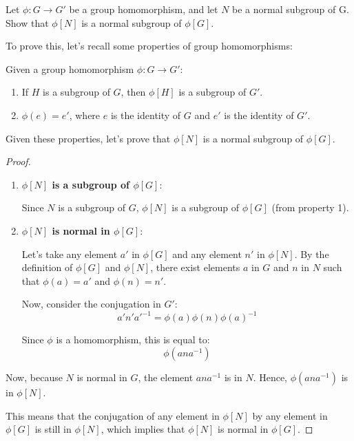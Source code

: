 \documentclass[12pt]{amsart}
\theoremstyle{definition}
\numberwithin{equation}{section}
\theoremstyle{plain}
\begin{document}
\begin{exercise}{35} Let $\phi : G \rightarrow G'$ be a group homomorphism, and let $N$ be a normal subgroup of G. Show that $\phi[N]$ is a normal subgroup of $\phi[G]$.
    
    To prove this, let's recall some properties of group homomorphisms:

    Given a group homomorphism \( \phi: G \rightarrow G' \):
    \begin{enumerate}
        \item If \( H \) is a subgroup of \( G \), then \( \phi[H] \) is a subgroup of \( G' \).
        \item \( \phi(e) = e' \), where \( e \) is the identity of \( G \) and \( e' \) is the identity of \( G' \).
    \end{enumerate}
    
    Given these properties, let's prove that \( \phi[N] \) is a normal subgroup of \( \phi[G] \).
    
    \begin{proof} $ $ \\
    
    \begin{enumerate}
        \item \textbf{\( \phi[N] \) is a subgroup of \( \phi[G] \)}:
        
        Since \( N \) is a subgroup of \( G \), \( \phi[N] \) is a subgroup of \( \phi[G] \) (from property 1).
        
        \item \textbf{\( \phi[N] \) is normal in \( \phi[G] \)}:
        
        Let's take any element \( a' \) in \( \phi[G] \) and any element \( n' \) in \( \phi[N] \). By the definition of \( \phi[G] \) and \( \phi[N] \), there exist elements \( a \) in \( G \) and \( n \) in \( N \) such that \( \phi(a) = a' \) and \( \phi(n) = n' \).
        
        Now, consider the conjugation in \( G' \):
        \[ a'n'a'^{-1} = \phi(a)\phi(n)\phi(a)^{-1} \]
        
        Since \( \phi \) is a homomorphism, this is equal to:
        \[ \phi(ana^{-1}) \]
    \end{enumerate}
    
    Now, because \( N \) is normal in \( G \), the element \( ana^{-1} \) is in \( N \). Hence, \( \phi(ana^{-1}) \) is in \( \phi[N] \). 
    
    This means that the conjugation of any element in \( \phi[N] \) by any element in \( \phi[G] \) is still in \( \phi[N] \), which implies that \( \phi[N] \) is normal in \( \phi[G] \).
    
    \end{proof}
\end{exercise}
\end{document}
